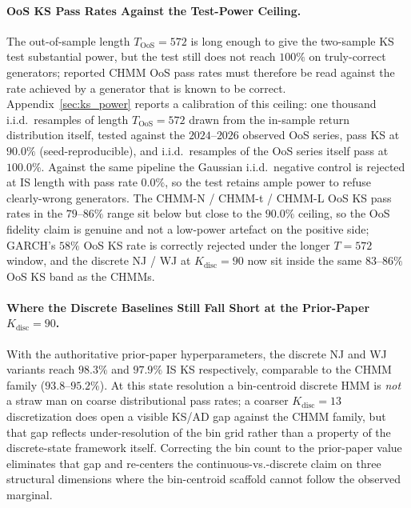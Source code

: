 \paragraph{OoS KS Pass Rates Against the Test-Power Ceiling.}
The out-of-sample length $T_{\text{OoS}} = 572$ is long enough to give the two-sample KS test substantial power, but the test still does not reach $100\%$ on truly-correct generators; reported CHMM OoS pass rates must therefore be read against the rate achieved by a generator that is known to be correct.
Appendix~\ref{sec:ks_power} reports a calibration of this ceiling: one thousand i.i.d.\ resamples of length $T_{\text{OoS}} = 572$ drawn from the in-sample return distribution itself, tested against the $2024$--$2026$ observed OoS series, pass KS at $90.0\%$ (seed-reproducible), and i.i.d.\ resamples of the OoS series itself pass at $100.0\%$.
Against the same pipeline the Gaussian i.i.d.\ negative control is rejected at IS length with pass rate $0.0\%$, so the test retains ample power to refuse clearly-wrong generators.
The CHMM-N / CHMM-t / CHMM-L OoS KS pass rates in the $79$--$86\%$ range sit below but close to the $90.0\%$ ceiling, so the OoS fidelity claim is genuine and not a low-power artefact on the positive side; GARCH's $58\%$ OoS KS rate is correctly rejected under the longer $T = 572$ window, and the discrete NJ / WJ at $K_{\text{disc}} = 90$ now sit inside the same $83$--$86\%$ OoS KS band as the CHMMs.

\paragraph{Where the Discrete Baselines Still Fall Short at the Prior-Paper $K_{\text{disc}} = 90$.}
With the authoritative prior-paper hyperparameters, the discrete NJ and WJ variants reach $98.3\%$ and $97.9\%$ IS KS respectively, comparable to the CHMM family ($93.8$--$95.2\%$).
At this state resolution a bin-centroid discrete HMM is \emph{not} a straw man on coarse distributional pass rates; a coarser $K_{\text{disc}} = 13$ discretization does open a visible KS/AD gap against the CHMM family, but that gap reflects under-resolution of the bin grid rather than a property of the discrete-state framework itself.
Correcting the bin count to the prior-paper value eliminates that gap and re-centers the continuous-vs.-discrete claim on three structural dimensions where the bin-centroid scaffold cannot follow the observed marginal.

